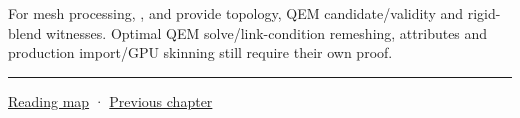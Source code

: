 For mesh processing, ,  and  provide topology, QEM candidate/validity and rigid-blend witnesses. Optimal QEM solve/link-condition remeshing, attributes and production import/GPU skinning still require their own proof.

\begin{center}\rule{0.5\linewidth}{0.5pt}\end{center}

\hyperref[volume-reading-map]{Reading map} · \hyperref[04-visual-computing-ii-ch042-xr-radiometry-optics-and-perception]{Previous chapter}
